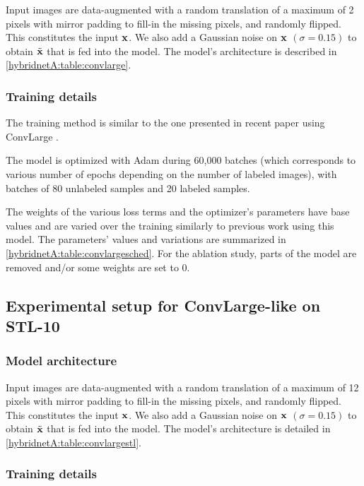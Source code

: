 Input images are data-augmented with a random translation of a maximum of 2 pixels with mirror padding to fill-in the missing pixels, and randomly flipped. This constitutes the input $\mathbf{x}$. We also add a Gaussian noise on $\mathbf{x}$ $(\sigma=0.15)$ to obtain $\tilde{\mathbf{x}}$ that is fed into the model.
The model's architecture is described in \autoref{hybridnetA:table:convlarge}.

\subsubsection{Training details}

The training method is similar to the one presented in recent paper using Conv\-Large \citep{Sajjadi2016,Laine2016,Tarvainen2017}.

The model is optimized with Adam during 60,000 batches (which corresponds to various number of epochs depending on the number of labeled images), with batches of 80 unlabeled samples and 20 labeled samples.

The weights of the various loss terms and the optimizer's parameters have base values and are varied over the training similarly to previous work using this model. The parameters' values and variations are summarized in \autoref{hybridnetA:table:convlargesched}. For the ablation study, parts of the model are removed and/or some weights are set to 0.


\subsection{Experimental setup for ConvLarge-like on STL-10}
\subsubsection{Model architecture}

Input images are data-augmented with a random translation of a maximum of 12 pixels with mirror padding to fill-in the missing pixels, and randomly flipped. This constitutes the input $\mathbf{x}$. We also add a Gaussian noise on $\mathbf{x}$ $(\sigma=0.15)$ to obtain $\tilde{\mathbf{x}}$ that is fed into the model.
The model's architecture is detailed in \autoref{hybridnetA:table:convlargestl}.



\subsubsection{Training details}

